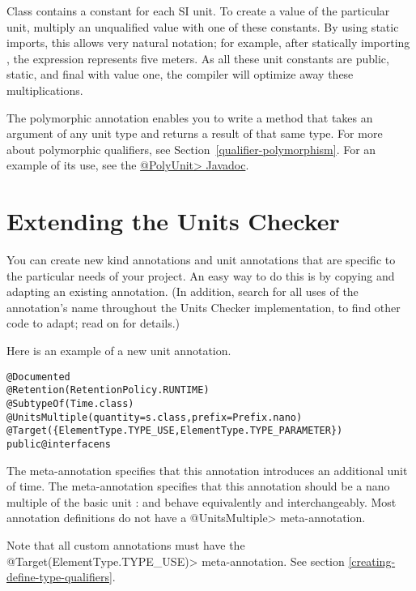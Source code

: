 Class  contains a constant for each SI unit.
To create a value of the particular unit, multiply an unqualified
value with one of these constants.
By using static imports, this allows very natural notation; for
example, after statically importing ,
the expression  represents five meters.
As all these unit constants are public, static, and final with value
one, the compiler will optimize away these multiplications.


The polymorphic annotation 
enables you to write a method that takes an argument of any unit type and
returns a result of that same type.  For more about polymorphic qualifiers,
see Section~\ref{qualifier-polymorphism}.  For an example of its use, see
the
\href{../api/org/checkerframework/checker/units/qual/PolyUnit.html}{\<@PolyUnit>
Javadoc}.


\section{Extending the Units Checker\label{extending-units}}

You can create new kind annotations and unit annotations that are specific
to the particular needs of your project.  An easy way to do this is by
copying and adapting an existing annotation.  (In addition, search for all
uses of the annotation's name throughout the Units Checker implementation,
to find other code to adapt; read on for details.)

Here is an example of a new unit annotation.

\begin{alltt}
@Documented
@Retention(RetentionPolicy.RUNTIME)
@SubtypeOf(\ttlcb{}Time.class\ttrcb{})
@UnitsMultiple(quantity=s.class, prefix=Prefix.nano)
@Target(\{ElementType.TYPE_USE, ElementType.TYPE_PARAMETER\})
public @interface ns \ttlcb{}\ttrcb{}
\end{alltt}

The  meta-annotation specifies that this annotation
introduces an additional unit of time.
The  meta-annotation specifies that this annotation
should be a nano multiple of the basic unit :   and
behave equivalently and interchangeably.
Most annotation definitions do not have a \<@UnitsMultiple> meta-annotation.

Note that all custom annotations must have the
\<@Target(ElementType.TYPE\_USE)> meta-annotation. See section
\ref{creating-define-type-qualifiers}.

